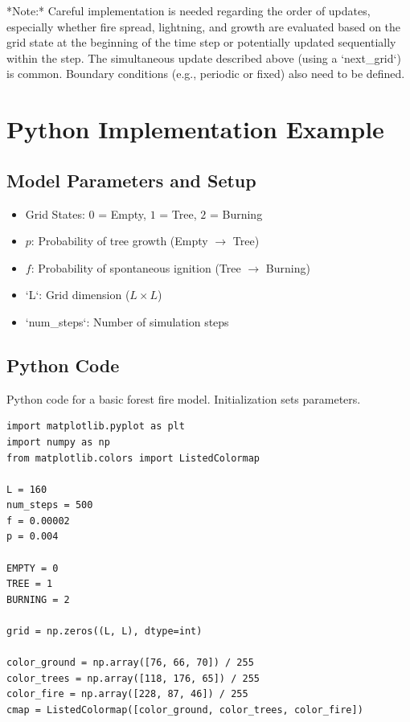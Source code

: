 \documentclass{article}
\begin{document}
*Note:* Careful implementation is needed regarding the order of updates, especially whether fire spread, lightning, and growth are evaluated based on the grid state at the beginning of the time step or potentially updated sequentially within the step. The simultaneous update described above (using a `next\_grid`) is common. Boundary conditions (e.g., periodic or fixed) also need to be defined.


\section{Python Implementation Example}



\subsection{Model Parameters and Setup}
\begin{itemize}
    \item Grid States: $0$ = Empty, $1$ = Tree, $2$ = Burning
    \item $p$: Probability of tree growth (Empty $\to$ Tree)
    \item $f$: Probability of spontaneous ignition (Tree $\to$ Burning)
    \item `L`: Grid dimension ($L \times L$)
    \item `num\_steps`: Number of simulation steps
\end{itemize}

\subsection{Python Code}
Python code for a basic forest fire model. Initialization sets parameters. 
\begin{lstlisting}[caption={Initial parameters}]
import matplotlib.pyplot as plt
import numpy as np
from matplotlib.colors import ListedColormap

L = 160
num_steps = 500
f = 0.00002
p = 0.004

EMPTY = 0
TREE = 1
BURNING = 2

grid = np.zeros((L, L), dtype=int)

color_ground = np.array([76, 66, 70]) / 255
color_trees = np.array([118, 176, 65]) / 255
color_fire = np.array([228, 87, 46]) / 255
cmap = ListedColormap([color_ground, color_trees, color_fire])
\end{lstlisting}
\end{document}
